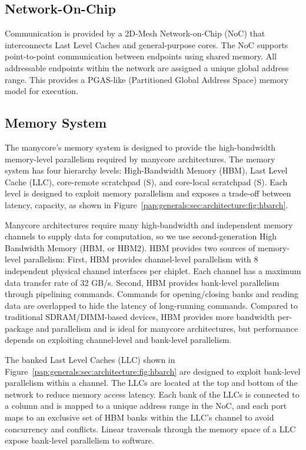 \manycoreArchFigure

\subsection{Network-On-Chip}
Communication is provided by a 2D-Mesh Network-on-Chip (NoC) that
interconnects Last Level Caches and general-purpose cores. The
NoC supports point-to-point communication between endpoints using
shared memory. All addressable endpoints within the network are
assigned a unique global address range. This provides a PGAS-like
(Partitioned Global Address Space) memory model for execution.

\subsection{Memory System}
The manycore's memory system is designed to provide the high-bandwidth memory-level parallelism required by manycore
architectures. The memory system has four hierarchy levels:
High-Bandwidth Memory (HBM), Last Level Cache (LLC), core-remote
scratchpad (S), and core-local scratchpad (S). Each level is designed
to exploit memory parallelism and exposes a trade-off between latency,
capacity, as shown in
Figure~\ref{pap:generals:sec:architecture:fig:hbarch}.

Manycore architectures require many high-bandwidth and independent
memory channels to supply data for computation, so we use
second-generation High Bandwidth Memory (HBM, or HBM2). HBM provides
two sources of memory-level parallelism: First, HBM provides
channel-level parallelism with 8 independent physical channel
interfaces per chiplet. Each channel has a maximum data transfer rate of 32
GB/s. Second, HBM provides bank-level parallelism through pipelining
commands. Commands for opening/closing banks and reading data are
overlapped to hide the latency of long-running commands. Compared to
traditional SDRAM/DIMM-based devices, HBM provides more bandwidth
per-package and parallelism and is ideal for manycore
architectures, but performance depends on exploiting channel-level and
bank-level parallelism.

The banked Last Level Caches (LLC) shown in 
Figure~\ref{pap:generals:sec:architecture:fig:hbarch} are designed
to exploit bank-level parallelism within a channel. The LLCs are located at the top and bottom of the network to reduce memory access latency.
Each bank of the LLCs is connected
to a column and is mapped to a unique address range in the NoC, and
each port maps to an exclusive set of HBM banks within the LLC's
channel to avoid concurrency and conflicts. Linear traversals through
the memory space of a LLC expose bank-level parallelism to software.

